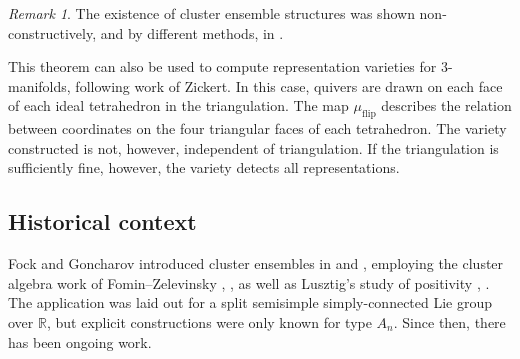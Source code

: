 \documentclass{amsart}
\theoremstyle{plain}
\theoremstyle{definition}
\theoremstyle{remark}
\newtheorem{remark}[theorem]{Remark}
\newcommand{\muflip}{{\mu_{\text{flip}}}}
\begin{document}
  \begin{remark}
    The existence of cluster ensemble structures was shown
    non-constructively, and by different methods, in
    \cite{goncharovshen2018}.
  \end{remark}

  This theorem can also be used to compute representation varieties for
  $3$-manifolds, following work of Zickert. In this case, quivers are
  drawn on each face of each ideal tetrahedron in the triangulation. The
  map $\muflip$ describes the relation between coordinates on the four
  triangular faces of each tetrahedron. The variety constructed is not,
  however, independent of triangulation. If the triangulation is
  sufficiently fine, however, the variety detects all representations.

  \subsection{Historical context}

  \label{sec:historical-context}

  Fock and Goncharov introduced cluster ensembles in
  \cite{fockgoncharov2006} and \cite{fockgoncharov2003}, employing the
  cluster algebra work of Fomin--Zelevinsky \cite{fominzelevinsky2002},
  \cite{fominzelevinsky2003}, \cite{fominzelevinsky2005} as well as
  Lusztig's study of positivity \cite{lusztig1994}, \cite{lusztig1997}.
  The application was laid out for a split semisimple simply-connected
  Lie group over $\mathbb{R}$, but explicit constructions were only
  known for type $A_n$. Since then, there has been ongoing work.
\end{document}
